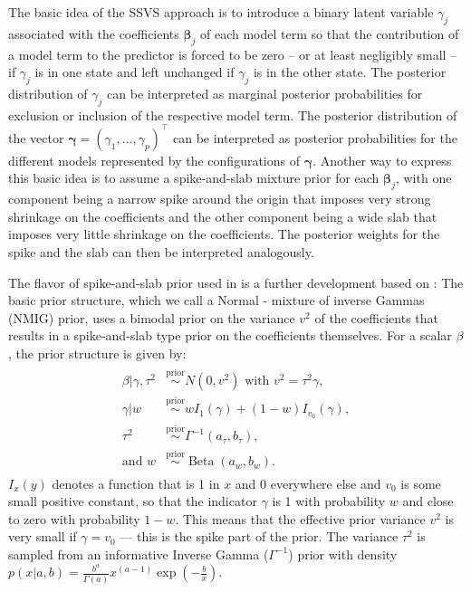 \documentclass[article, shortnames, nojss, noheadings, notitle]{jss}
\newcommand{\priorsim}{\stackrel{\text{prior}}{\sim}}
\begin{document}
The basic idea of the SSVS approach \citep{George:McCulloch:1993} is to introduce a binary latent variable
$\gamma_j$ associated with the coefficients $\bm{\beta}_j$ of each model term so that the contribution of a model
term to the predictor is forced to be zero -- or at least negligibly small -- if $\gamma_j$ is in one state and
left unchanged if $\gamma_j$ is in the other state.
The posterior distribution of $\gamma_j$ can be interpreted as marginal
posterior probabilities for exclusion or inclusion of the respective model term. The posterior distribution
of the vector $\bm\gamma = (\gamma_1,\ldots,\gamma_p)^\top$ can be interpreted as posterior probabilities for the different
models represented by the configurations of $\bm\gamma$. Another way to express this basic idea is to assume
a spike-and-slab mixture prior for each $\bm{\beta}_j$, with one component being a narrow spike around the origin that
imposes very strong shrinkage on the coefficients and the other component being a wide slab that imposes
very little shrinkage on the coefficients. The posterior weights for the spike and the slab can then be interpreted
analogously.

The flavor of spike-and-slab prior used in  is a further development based on \citet{Ishwaran:2005}:
The basic prior structure,
which we call a Normal - mixture of inverse Gammas (NMIG) prior, uses
a bimodal prior on the variance $v^2$ of the coefficients that results in a spike-and-slab type prior on
the coefficients themselves. For a scalar $\beta$, the prior structure is given by:
\begin{align}\label{F:basicNMIG}
\begin{split}
\beta|\gamma, \tau^2 &\priorsim N(0, v^2)\text{ with }v^2 = \tau^2\gamma,\\
\gamma|w &\priorsim w I_1(\gamma) + (1-w)I_{v_0}(\gamma), \\
\tau^2 &\priorsim \Gamma^{-1}(a_\tau, b_\tau), \\
\text{and } w &\priorsim \operatorname{Beta}(a_w, b_w).
\end{split}
\end{align}
$I_x(y)$ denotes a function that is 1 in $x$ and 0 everywhere else and $v_0$ is some small positive constant,
so that the indicator $\gamma$ is 1 with probability $w$ and close to zero with probability $1-w$.
This means that the effective prior variance $v^2$ is very small if $\gamma=v_0$
--- this is the spike part of the prior. The variance $\tau^2$ is sampled from an informative
Inverse Gamma ($\Gamma^{-1}$) prior with density $p(x| a, b) = \tfrac{b^a}{\Gamma(a)} x^{(a-1)} \exp\left(-\tfrac{b}{x}\right)$.
\end{document}
